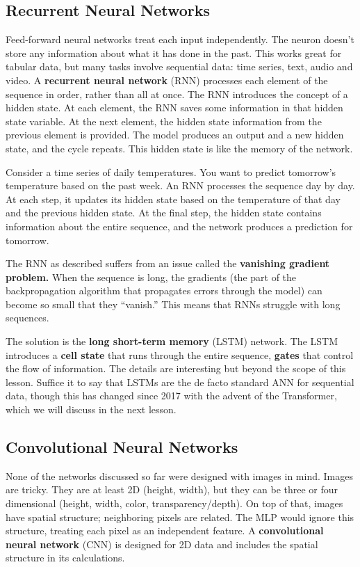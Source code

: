 \subsection*{Recurrent Neural Networks}
Feed-forward neural networks treat each input independently. The neuron doesn't store any information about what it has done in the past. This works great for tabular data, but many tasks involve sequential data: time series, text, audio and video. A \textbf{recurrent neural network} (RNN) processes each element of the sequence in order, rather than all at once. The RNN introduces the concept of a hidden state. At each element, the RNN saves some information in that hidden state variable. At the next element, the hidden state information from the previous element is provided. The model produces an output and a new hidden state, and the cycle repeats. This hidden state is like the memory of the network.

Consider a time series of daily temperatures. You want to predict tomorrow's temperature based on the past week. An RNN processes the sequence day by day. At each step, it updates its hidden state based on the temperature of that day and the previous hidden state. At the final step, the hidden state contains information about the entire sequence, and the network produces a prediction for tomorrow.

The RNN as described suffers from an issue called the \textbf{vanishing gradient problem.} When the sequence is long, the gradients (the part of the backpropagation algorithm that propagates errors through the model) can become so small that they ``vanish.'' This means that RNNs struggle with long sequences.

The solution is the \textbf{long short-term memory} (LSTM) network. The LSTM introduces a \textbf{cell state} that runs through the entire sequence, \textbf{gates} that control the flow of information. The details are interesting but beyond the scope of this lesson. Suffice it to say that LSTMs are the de facto standard ANN for sequential data, though this has changed since 2017 with the advent of the Transformer, which we will discuss in the next lesson.

\subsection*{Convolutional Neural Networks}
None of the networks discussed so far were designed with images in mind. Images are tricky. They are at least 2D (height, width), but they can be three or four dimensional (height, width, color, transparency/depth). On top of that, images have spatial structure; neighboring pixels are related. The MLP would ignore this structure, treating each pixel as an independent feature. A \textbf{convolutional neural network} (CNN) is designed for 2D data and includes the spatial structure in its calculations.


